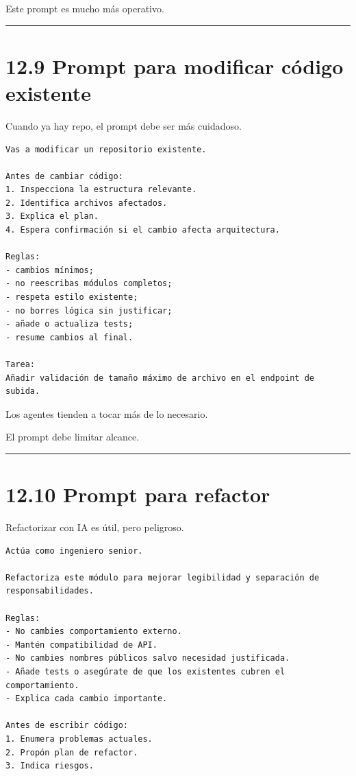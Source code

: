 Este prompt es mucho más operativo.

\begin{center}\rule{0.5\linewidth}{0.5pt}\end{center}

\section{12.9 Prompt para modificar código
existente}\label{prompt-para-modificar-cuxf3digo-existente}

Cuando ya hay repo, el prompt debe ser más cuidadoso.

\begin{lstlisting}
Vas a modificar un repositorio existente.

Antes de cambiar código:
1. Inspecciona la estructura relevante.
2. Identifica archivos afectados.
3. Explica el plan.
4. Espera confirmación si el cambio afecta arquitectura.

Reglas:
- cambios mínimos;
- no reescribas módulos completos;
- respeta estilo existente;
- no borres lógica sin justificar;
- añade o actualiza tests;
- resume cambios al final.

Tarea:
Añadir validación de tamaño máximo de archivo en el endpoint de subida.
\end{lstlisting}

Los agentes tienden a tocar más de lo necesario.

El prompt debe limitar alcance.

\begin{center}\rule{0.5\linewidth}{0.5pt}\end{center}

\section{12.10 Prompt para refactor}\label{prompt-para-refactor}

Refactorizar con IA es útil, pero peligroso.

\begin{lstlisting}
Actúa como ingeniero senior.

Refactoriza este módulo para mejorar legibilidad y separación de responsabilidades.

Reglas:
- No cambies comportamiento externo.
- Mantén compatibilidad de API.
- No cambies nombres públicos salvo necesidad justificada.
- Añade tests o asegúrate de que los existentes cubren el comportamiento.
- Explica cada cambio importante.

Antes de escribir código:
1. Enumera problemas actuales.
2. Propón plan de refactor.
3. Indica riesgos.
\end{lstlisting}


